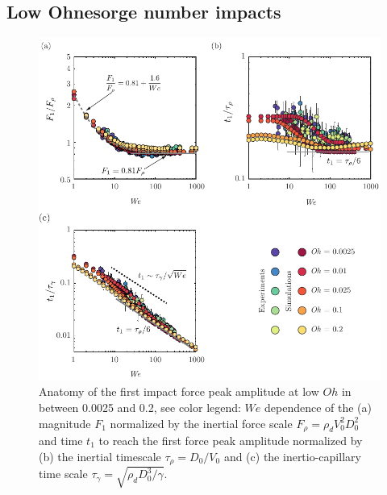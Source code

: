 \documentclass{jfm}
\begin{document}
\subsection{Low Ohnesorge number impacts}\label{sec:FirstInertialPeak}
\begin{figure}
	\centering
	\includegraphics[width=\textwidth]{Figures/Force1_Anatomy_v2.pdf}
	\caption{Anatomy of the first impact force peak amplitude at low $Oh$ in between 0.0025 and 0.2, see color legend: $We$ dependence of the (a) magnitude $F_1$ normalized by the inertial force scale $F_\rho = \rho_dV_0^2D_0^2$ and time $t_1$ to reach the first force peak amplitude normalized by (b) the inertial timescale $\tau_\rho = D_0/V_0$ and (c) the inertio-capillary time scale $\tau_\gamma = \sqrt{\rho_dD_0^3/\gamma}$.}
	\label{fig:F1Anatomy}
\end{figure}
\end{document}
